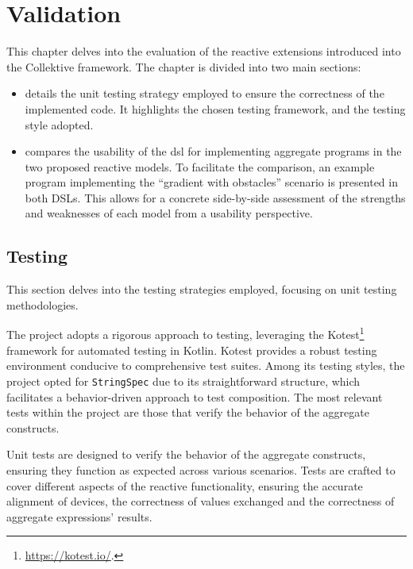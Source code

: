 
\chapter{Validation}
\label{chap:evaluation}

This chapter delves into the evaluation of the reactive extensions introduced into the Collektive framework. The chapter is divided into two main sections:

\begin{itemize}
    \item {} details the unit testing strategy employed to ensure the correctness of the implemented code. It highlights the chosen testing framework, and the testing style adopted.
    \item {} compares the usability of the \ac{dsl} for implementing aggregate programs in the two proposed reactive models. To facilitate the comparison, an example program implementing the ``gradient with obstacles'' scenario is presented in both DSLs. This allows for a concrete side-by-side assessment of the strengths and weaknesses of each model from a usability perspective.
\end{itemize}

\section{Testing}
\label{section:testing}

This section delves into the testing strategies employed, focusing on unit testing methodologies.

The project adopts a rigorous approach to testing, leveraging the Kotest\footnote{\url{https://kotest.io/}.} framework for automated testing in Kotlin. Kotest provides a robust testing environment conducive to comprehensive test suites. Among its testing styles, the project opted for \texttt{StringSpec} due to its straightforward structure, which facilitates a behavior-driven approach to test composition. The most relevant tests within the project are those that verify the behavior of the aggregate constructs.

Unit tests are designed to verify the behavior of the aggregate constructs, ensuring they function as expected across various scenarios. Tests are crafted to cover different aspects of the reactive functionality, ensuring the accurate alignment of devices, the correctness of values exchanged and the correctness of aggregate expressions' results.


